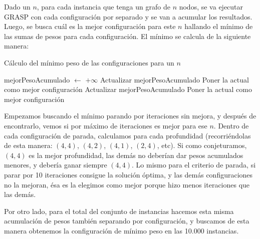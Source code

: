 Dado un $n$, para cada instancia que tenga un grafo de $n$ nodos, se va ejecutar GRASP con cada configuración por separado y se van a acumular los resultados. Luego, se busca cuál es la mejor configuración para este $n$ hallando el mínimo de las sumas de pesos para cada configuración. El mínimo se calcula de la siguiente manera:
\begin{algorithm}[H]
\begin{algorithmic}[1]
\caption{Cálculo del mínimo peso de las configuraciones para un $n$}
\STATE mejorPesoAcumulado $\leftarrow$ $+ \infty$
                \STATE Actualizar mejorPesoAcumulado
                \STATE Poner la actual como mejor configuración
            \ENDIF
        \ENDFOR
    \ENDFOR
\ENDFOR
{}
                \STATE Actualizar mejorPesoAcumulado
                \STATE Poner la actual como mejor configuración
            \ENDIF
        \ENDFOR
    \ENDFOR
\ENDFOR
\end{algorithmic}
\end{algorithm}
Empezamos buscando el mínimo parando por iteraciones sin mejora, y después de encontrarlo, vemos si por máximo de iteraciones es mejor para ese $n$. Dentro de cada configuración de parada, calculamos para cada profundidad (recorriéndolas de esta manera: $(4,4)$, $(4,2)$, $(4,1)$, $(2,4)$, etc). Si como conjeturamos, $(4,4)$ es la mejor profundidad, las demás no deberían dar pesos acumulados menores, y debería ganar siempre $(4,4)$. Lo mismo para el criterio de parada, si parar por 10 iteraciones consigue la solución óptima, y las demás configuraciones no la mejoran, ésa es la elegimos como mejor porque hizo menos iteraciones que las demás.

Por otro lado, para el total del conjunto de instancias hacemos esta misma acumulación de pesos también separando por configuración, y buscamos de esta manera obtenemos la configuración de mínimo peso en las 10.000 instancias.

